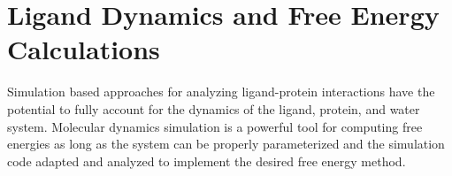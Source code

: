 \section{Ligand Dynamics and Free Energy Calculations}
  
Simulation based approaches for analyzing ligand-protein interactions have the potential to fully account for the dynamics of the ligand, protein, and water system.  Molecular dynamics simulation is a powerful tool for computing free energies as long as the system can be properly parameterized and the simulation code adapted and analyzed to implement the desired free energy method.

